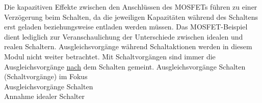 \begin{frame}
{	%
	Die kapazitiven Effekte zwischen den Anschlüssen des MOSFETs führen zu einer Verzögerung beim Schalten,
	da die jeweiligen Kapazitäten während des Schaltens erst geladen beziehungsweise entladen werden müssen.
	Das MOSFET-Beispiel dient lediglich zur Veranschaulichung der Unterschiede zwischen idealen und realen Schaltern.
	Ausgleichsvorgänge während Schaltaktionen werden in diesem Modul nicht weiter betrachtet.
	Mit Schaltvorgängen sind immer die Ausgleichsvorgänge \underline{nach} dem Schalten gemeint.
}%
\b{%
	 Ausgleichsvorgänge  Schalten (Schaltvorgänge) im Fokus
	\\[+4pt]%
	 Ausgleichsvorgänge  Schalten
	\\[+4pt]%
	 Annahme idealer Schalter 
}
\end{frame}




